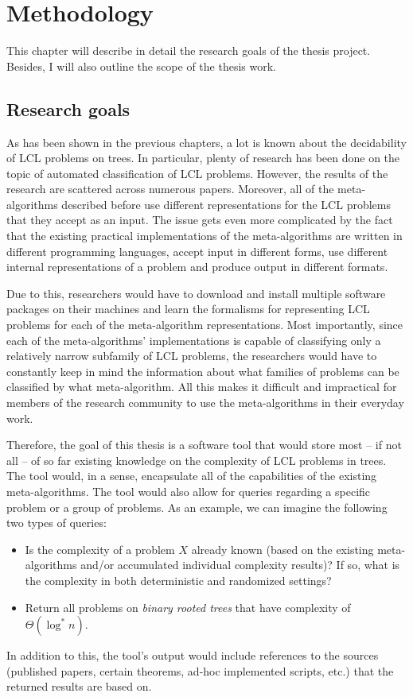 \chapter{Methodology}
\label{chapter:methods}

This chapter will describe in detail the research goals of the thesis project. Besides, I will also outline the scope of the thesis work.

\section{Research goals}

As has been shown in the previous chapters, a lot is known about the decidability
of LCL problems on trees. In particular, plenty of research has been done
on the topic of automated classification of LCL problems. However, the
results of the research are scattered across numerous papers. Moreover,
all of the meta-algorithms described before use different representations for
the LCL problems that they accept as an input.
The issue gets even more complicated by the fact that the existing practical implementations
of the meta-algorithms are written in different programming languages, accept input in
different forms,
use different internal representations of a problem and produce output in different
formats.

Due to this, researchers would
have to download and install multiple software packages on their machines and learn
the formalisms for representing LCL problems for each of the meta-algorithm
representations. Most importantly, since each of the meta-algorithms' implementations
is capable of classifying only a relatively narrow subfamily of LCL problems, the
researchers would have to constantly keep in mind the information about what families
of problems can be classified by what meta-algorithm.
All this makes it difficult and impractical for members of
the research community
to use the meta-algorithms in their everyday work.

Therefore, the goal of this thesis is a software tool that would store most -- if not all -- of
so far existing knowledge on the complexity of LCL problems in trees.
The tool would, in a sense, encapsulate all of the capabilities
of the existing meta-algorithms.
The tool would also allow for queries regarding a specific problem or a group of
problems. As an example, we can imagine the following two types of queries:
\begin{itemize}
  \item Is the complexity of a problem $X$ already known (based on the existing meta-algorithms
  and/or accumulated individual complexity results)? If so, what is the complexity in both
  deterministic and randomized settings?
  \item Return all problems on \emph{binary rooted trees} that have complexity of
  $\Theta(\log^* n)$.
\end{itemize}
In addition to this, the tool’s output would include references to
the sources
(published papers, certain theorems, ad-hoc implemented scripts, etc.)
that the returned results are based on.

